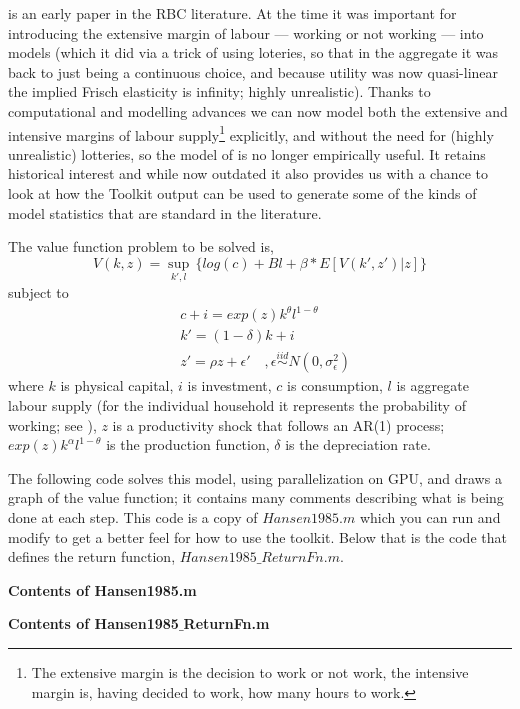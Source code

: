 %

\cite{Hansen1985} is an early paper in the RBC literature. At the time it was important for introducing the extensive margin of labour --- working
or not working --- into models (which it did via a trick of using loteries, so that in the aggregate it was back to just being a continuous choice,
and because utility was now quasi-linear the implied Frisch elasticity is infinity; highly unrealistic). Thanks to computational and modelling advances we can now
model both the extensive and intensive margins of labour supply\footnote{The extensive margin is the decision to work or not work, the intensive margin is, 
having decided to work, how many hours to work.} explicitly, and without the need for (highly unrealistic) lotteries, so the model
of \cite{Hansen1985} is no longer empirically useful. It retains historical interest and while now outdated it also provides us with a chance to look
at how the Toolkit output can be used to generate some of the kinds of model statistics that are standard in the literature.

The value function problem to be solved is,
\begin{equation*}
 V(k,z)=\sup_{k',l} \, \{ log(c)+B l+\beta*E[V(k',z')|z] \}
\end{equation*}
subject to
\begin{eqnarray}
 & c+i= exp(z) k^{\theta} l^{1-\theta} \\
 & k'=(1-\delta)k+i \\
 & z'=\rho z +\epsilon' \quad ,\epsilon \overset{iid}{\sim} N(0,\sigma_{\epsilon}^2)
\end{eqnarray}
where $k$ is physical capital, $i$ is investment, $c$ is consumption, $l$ is aggregate labour supply (for the individual household it represents
the probability of working; see \cite{Hansen1985}), $z$ is a productivity shock that follows an AR(1) process; 
$exp(z) k^{\alpha} l^{1-\theta}$ is the production function, $\delta$ is the depreciation rate.


The following code solves this model, using parallelization on GPU, and draws a graph of the value function; it contains many comments describing what is being done
at each step. This code is a copy of $Hansen1985.m$ which you can run and modify to get a better feel for how
to use the toolkit. Below that is the code that defines the return function, $Hansen1985\_{}ReturnFn.m$.

\textbf{Contents of Hansen1985.m}


\smallskip

\textbf{Contents of Hansen1985$\_{}$ReturnFn.m}


%